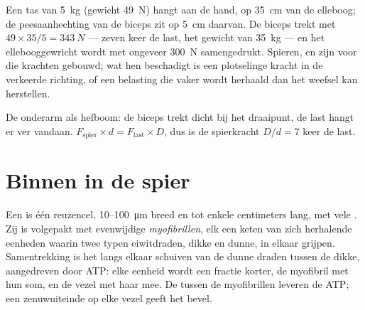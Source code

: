 \begin{example}\label{ex:g10:muscles-and-joints:bag}
Een tas van \qty{5}{kg} (gewicht \qty{49}{N}) hangt aan de hand, op
\qty{35}{cm} van de elleboog; de peesaanhechting van de biceps zit op
\qty{5}{cm} daarvan. De biceps trekt met $49 \times 35/5 = \qty{343}{N}$
--- zeven keer de last, het gewicht van \qty{35}{kg} --- en het
ellebooggewricht wordt met ongeveer \qty{300}{N} samengedrukt. Spieren,
 en  zijn voor die krachten gebouwd; wat hen beschadigt is
een plotselinge kracht in de verkeerde richting, of een belasting die
vaker wordt herhaald dan het weefsel kan herstellen.
\end{example}

\begin{omfigure}

{\small De onderarm als hefboom: de biceps trekt dicht bij het draaipunt,
de last hangt er ver vandaan. $F_{\text{spier}} \times d =
F_{\text{last}} \times D$, dus is de spierkracht $D/d = 7$ keer de
last.}
\end{omfigure}

\section{Binnen in de spier}

\begin{proposition}\label{prop:g10:muscles-and-joints:fibre}
Een  is één reuzencel, \num{10}--\qty{100}{\micro m} breed en
tot enkele centimeters lang, met vele . Zij is volgepakt met
evenwijdige \emph{myofibrillen}, elk een keten van zich herhalende
eenheden waarin twee typen eiwitdraden, dikke en dunne, in elkaar
grijpen. Samentrekking is het langs elkaar schuiven van de dunne draden
tussen de dikke, aangedreven door ATP: elke eenheid wordt een fractie
korter, de myofibril met hun som, en de vezel met haar mee. De
 tussen de myofibrillen leveren de ATP; een zenuwuiteinde
op elke vezel geeft het bevel.
\end{proposition}
\admitted

